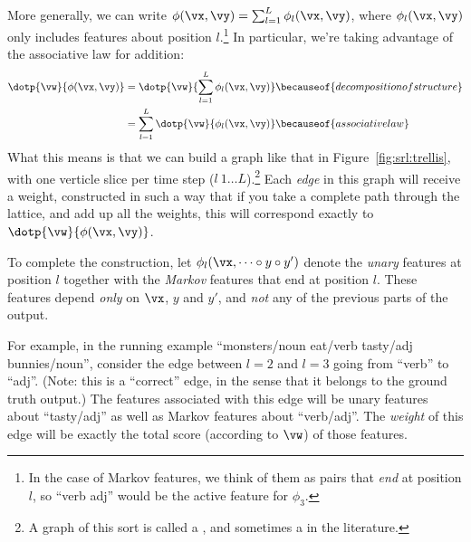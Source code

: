 More generally, we can write $\phi(\vx,\vy) = \sum_{l=1}^L \phi_l(\vx,\vy)$, where $\phi_l(\vx,\vy)$ only includes features about position $l$.\footnote{In the case of Markov features, we think of them as pairs that \emph{end} at position $l$, so ``verb adj'' would be the active feature for $\phi_3$.}
In particular, we're taking advantage of the associative law for addition:
%
\begin{align}
  \dotp{\vw}{\phi(\vx,\vy)}
  &= \dotp{\vw}{\sum_{l=1}^L \phi_l(\vx, \vy)} \becauseof{decomposition of structure} \\
  &= \sum_{l=1}^L \dotp{\vw}{\phi_l(\vx, \vy)} \becauseof{associative law}
\end{align}
%
What this means is that we can build a graph like that in Figure~\ref{fig:srl:trellis}, with one verticle slice per time step ($l \ 1 \dots L$).\footnote{A graph of this sort is called a , and sometimes a  in the literature.}
Each \emph{edge} in this graph will receive a weight, constructed in such a way that if you take a complete path through the lattice, and add up all the weights, this will correspond exactly to $\dotp{\vw}{\phi(\vx,\vy)}$.


To complete the construction, let $\phi_l(\vx, \dots \circ y \circ y')$ denote the \emph{unary} features at position $l$ together with the \emph{Markov} features that end at position $l$. These features depend \emph{only} on $\vx$, $y$ and $y'$, and \emph{not} any of the previous parts of the output.

For example, in the running example ``monsters/noun eat/verb tasty/adj bunnies/noun'', consider the edge between $l=2$ and $l=3$ going from ``verb'' to ``adj''. (Note: this is a ``correct'' edge, in the sense that it belongs to the ground truth output.)
The features associated with this edge will be unary features about ``tasty/adj'' as well as Markov features about ``verb/adj''.
The \emph{weight} of this edge will be exactly the total score (according to $\vw$) of those features.

